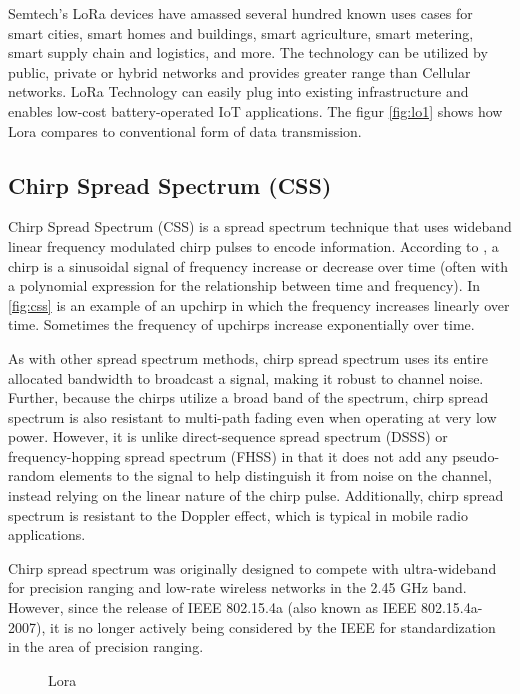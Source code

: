 Semtech’s LoRa devices have amassed several hundred known uses cases for smart cities, smart homes and buildings, smart agriculture, smart metering, smart supply chain and logistics, and more. The technology can be utilized by public, private or hybrid networks and provides greater range than Cellular networks. LoRa Technology can easily plug into existing infrastructure and enables low-cost battery-operated IoT applications. The figur \ref{fig:lo1} shows how Lora compares to conventional form of data transmission. 

\subsection{Chirp Spread Spectrum (CSS)}
Chirp Spread Spectrum (CSS) is a spread spectrum technique that uses wideband linear frequency modulated chirp pulses to encode information. According to \citep{lorabk}, a chirp is a sinusoidal signal of frequency increase or decrease over time (often with a polynomial expression for the relationship between time and frequency). In \ref{fig:css} is an example of an upchirp in which the frequency increases linearly over time. Sometimes the frequency of upchirps increase exponentially over time. 

As with other spread spectrum methods, chirp spread spectrum uses its entire allocated bandwidth to broadcast a signal, making it robust to channel noise. Further, because the chirps utilize a broad band of the spectrum, chirp spread spectrum is also resistant to multi-path fading even when operating at very low power. However, it is unlike direct-sequence spread spectrum (DSSS) or frequency-hopping spread spectrum (FHSS) in that it does not add any pseudo-random elements to the signal to help distinguish it from noise on the channel, instead relying on the linear nature of the chirp pulse. Additionally, chirp spread spectrum is resistant to the Doppler effect, which is typical in mobile radio applications.

Chirp spread spectrum was originally designed to compete with ultra-wideband for precision ranging and low-rate wireless networks in the 2.45 GHz band. However, since the release of IEEE 802.15.4a (also known as IEEE 802.15.4a-2007), it is no longer actively being considered by the IEEE for standardization in the area of precision ranging.




\begin{figure}[p]
\begin{center}
\end{center}

\caption{Lora}
\label{fig:lora_and_tht}
\end{figure}

